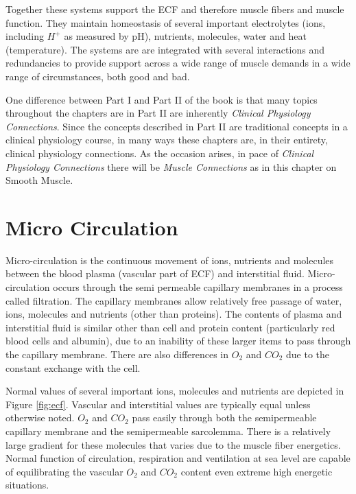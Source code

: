 Together these systems support the ECF and therefore muscle fibers and muscle function. They maintain homeostasis of several important electrolytes (ions, including $H^+$ as measured by pH), nutrients, molecules, water and heat (temperature). The systems are are integrated with several interactions and redundancies to provide support across a wide range of muscle demands in a wide range of circumstances, both good and bad.

One difference between Part I and Part II of the book is that many topics throughout the chapters are in Part II are inherently \textit{Clinical Physiology Connections}. Since the concepts described in Part II are traditional concepts in a clinical physiology course, in many ways these chapters are, in their entirety, clinical physiology connections. As the occasion arises, in pace of \textit{Clinical Physiology Connections} there will be \textit{Muscle Connections} as in this chapter on Smooth Muscle.

\section{Micro Circulation}

Micro-circulation is the continuous movement of ions, nutrients and molecules between the blood plasma (vascular part of ECF) and interstitial fluid. Micro-circulation occurs through the semi permeable capillary membranes in a process called filtration. The capillary membranes allow relatively free passage of water, ions, molecules and  nutrients (other than proteins). The contents of plasma and interstitial fluid is similar other than cell and protein content (particularly red blood cells and albumin), due to an inability of these larger items to pass through the capillary membrane. There are also differences in $O_2$ and $CO_2$ due to the constant exchange with the cell.

Normal values of several important ions, molecules and nutrients are depicted in Figure \ref{fig:ecf}. Vascular and interstitial values are typically equal unless otherwise noted. $O_2$ and $CO_2$ pass easily through both the semipermeable capillary membrane and the semipermeable sarcolemma. There is a relatively large gradient for these molecules that varies due to the muscle fiber energetics. Normal function of circulation, respiration and ventilation at sea level are capable of equilibrating the vascular $O_2$ and $CO_2$ content even extreme high energetic situations.

